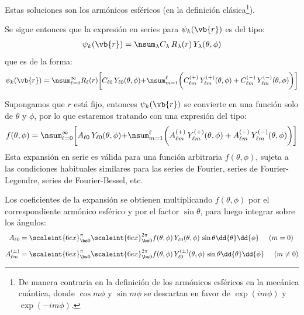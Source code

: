 Estas soluciones son los armónicos esféricos (en la definición clásica\footnote{De manera contraria en la definición de los armónicos esféricos en la mecánica cuántica, donde $\cos m \phi$ y $\sin m \phi$ se descartan en favor de $\exp(i m \phi)$ y $\exp(-i m \phi)$.}).
\par
Se sigue entonces que la expresión en series para $\psi_{k} (\vb{r})$ es del tipo:
\begin{align*}
\psi_{k} (\vb{r}) = \nsum_{\lambda} C_{\lambda} \, R_{\lambda} (r) \, Y_{\lambda} (\theta, \phi)
\end{align*}
que es de la forma:
\begin{align*}
\psi_{k} (\vb{r}) = \nsum_{\ell=0}^{\infty} R_{\ell} (r) \bigg[ C_{\ell 0} \, Y_{\ell 0} (\theta, \phi) {+} \nsum_{m=1}^{\ell} \bigg( C_{\ell m}^{(+)} \, Y_{\ell m}^{(+)} (\theta, \phi) + C_{\ell m}^{(-)} \, Y_{\ell m}^{(-)} (\theta, \phi) \bigg) \bigg]
\end{align*}

Supongamos que $r$ está fijo, entonces $\psi_{k} (\vb{r})$ se convierte en una función solo de $\theta$ y $\phi$, por lo que estaremos tratando con una expresión del tipo:
\begin{align*}
f (\theta, \phi) = \nsum_{\ell=0}^{\infty} \bigg[ A_{\ell 0} \, Y_{\ell 0} (\theta, \phi) {+} \nsum_{m=1}^{\ell} \bigg( A_{\ell m}^{(+)} \, Y_{\ell m}^{(+)} (\theta, \phi) + A_{\ell m}^{(-)} \, Y_{\ell m}^{(-)} (\theta, \phi) \bigg) \bigg]
\end{align*}
Esta expansión en serie es válida para una función arbitraria $f (\theta, \phi)$, sujeta a las condiciones habituales similares para las series de Fourier, series de Fourier-Legendre, series de Fourier-Bessel, etc.
\par
Los coeficientes de la expansión se obtienen multiplicando $f (\theta, \phi)$ por el correspondiente armónico esférico y por el factor $\sin \theta$, para luego integrar sobre los ángulos:
\begin{align*}
A_{\ell 0} &= \scaleint{6ex}_{\bs 0}^{\pi} \scaleint{6ex}_{\bs 0}^{2 \pi} f (\theta, \phi) \, Y_{\ell 0} (\theta, \phi) \, \sin \theta \dd{\theta} \dd{\phi} \hspace{0.5cm} (m = 0) \\[0.5em] 
A_{\ell m}^{(\pm)} &= \scaleint{6ex}_{\bs 0}^{\pi} \scaleint{6ex}_{\bs 0}^{2 \pi} f (\theta, \phi) \, Y_{\ell 0}^{(\pm)} (\theta, \phi) \, \sin \theta \dd{\theta} \dd{\phi} \hspace{0.5cm} (m \neq 0)
\end{align*}

